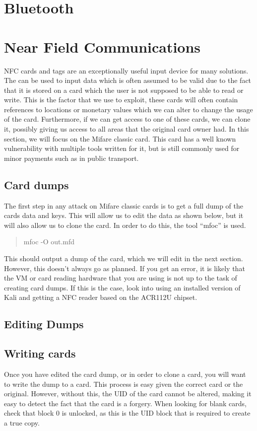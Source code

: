 \documentclass[a4paper,11pt]{report}
\begin{document}
	\section{Bluetooth}
	\section{Near Field Communications}
		NFC cards and tags are an exceptionally useful input device for many solutions. 
		The can be used to input data which is often assumed to be valid due to the fact that it is stored on a card which the user is not supposed to be able to read or write. 
		This is the factor that we use to exploit, these cards will often contain references to locations or monetary values which we can alter to change the usage of the card. 
		Furthermore, if we can get access to one of these cards, we can clone it, possibly giving us access to all areas that the original card owner had. 
		In this section, we will focus on the Mifare classic card. 
		This card has a well known vulnerability with multiple tools written for it, but is still commonly used for minor payments such as in public transport. 
		\subsection{Card dumps}
			The first step in any attack on Mifare classic cards is to get a full dump of the cards data and keys. 
			This will allow us to edit the data as shown below, but it will also allow us to clone the card. 
			In order to do this, the tool ``mfoc'' is used. 
			\begin{quote}
				mfoc -O out.mfd
			\end{quote}
			This should output a dump of the card, which we will edit in the next section. 
			However, this doesn't always go as planned. 
			If you get an error, it is likely that the VM or card reading hardware that you are using is not up to the task of creating card dumps. 
			If this is the case, look into using an installed version of Kali and getting a NFC reader based on the ACR112U chipset. 
		\subsection{Editing Dumps}
		\subsection{Writing cards}
			Once you have edited the card dump, or in order to clone a card, you will want to write the dump to a card. 
			This process is easy given the correct card or the original. 
			However, without this, the UID of the card cannot be altered, making it easy to detect the fact that the card is a forgery. 
			When looking for blank cards, check that block 0 is unlocked, as this is the UID block that is required to create a true copy. 
\end{document}
